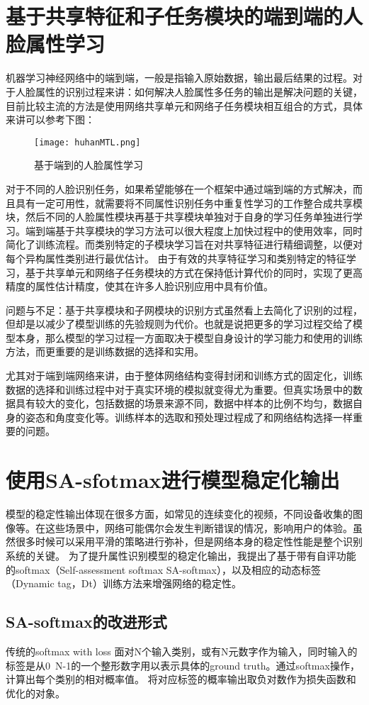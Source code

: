 \section{基于共享特征和子任务模块的端到端的人脸属性学习}
机器学习神经网络中的端到端，一般是指输入原始数据，输出最后结果的过程。对于人脸属性的识别过程来讲：如何解决人脸属性多任务的输出是解决问题的关键，目前比较主流的方法是使用网络共享单元和网络子任务模块相互组合的方式，具体来讲可以参考下图：
\begin{figure}[!ht]
 \centering
	\texttt{[image: huhanMTL.png]}
	\caption{基于端到的人脸属性学习}
\end{figure}
对于不同的人脸识别任务，如果希望能够在一个框架中通过端到端的方式解决，而且具有一定可用性，就需要将不同属性识别任务中重复性学习的工作整合成共享模块，然后不同的人脸属性模块再基于共享模块单独对于自身的学习任务单独进行学习。端到端基于共享模块的学习方法可以很大程度上加快过程中的使用效率，同时简化了训练流程。而类别特定的子模块学习旨在对共享特征进行精细调整，以便对每个异构属性类别进行最优估计。 由于有效的共享特征学习和类别特定的特征学习，基于共享单元和网络子任务模块的方式在保持低计算代价的同时，实现了更高精度的属性估计精度，使其在许多人脸识别应用中具有价值。

问题与不足：基于共享模块和子网模块的识别方式虽然看上去简化了识别的过程，但却是以减少了模型训练的先验规则为代价。也就是说把更多的学习过程交给了模型本身，那么模型的学习过程一方面取决于模型自身设计的学习能力和使用的训练方法，而更重要的是训练数据的选择和实用。

尤其对于端到端网络来讲，由于整体网络结构变得封闭和训练方式的固定化，训练数据的选择和训练过程中对于真实环境的模拟就变得尤为重要。但真实场景中的数据具有较大的变化，包括数据的场景来源不同，数据中样本的比例不均匀，数据自身的姿态和角度变化等。训练样本的选取和预处理过程成了和网络结构选择一样重要的问题。

\section{使用SA-sfotmax进行模型稳定化输出}
模型的稳定性输出体现在很多方面，如常见的连续变化的视频，不同设备收集的图像等。在这些场景中，网络可能偶尔会发生判断错误的情况，影响用户的体验。虽然很多时候可以采用平滑的策略进行弥补，但是网络本身的稳定性性能是整个识别系统的关键。
为了提升属性识别模型的稳定化输出，我提出了基于带有自评功能的softmax（Self-assessment softmax SA-softmax），以及相应的动态标签（Dynamic tag，Dt）训练方法来增强网络的稳定性。
 
\subsection{SA-softmax的改进形式}
传统的softmax with loss 面对N个输入类别，或有N元数字作为输入，同时输入的标签是从0~N-1的一个整形数字用以表示具体的ground truth。通过softmax操作，计算出每个类别的相对概率值。
将对应标签的概率输出取负对数作为损失函数和优化的对象。

